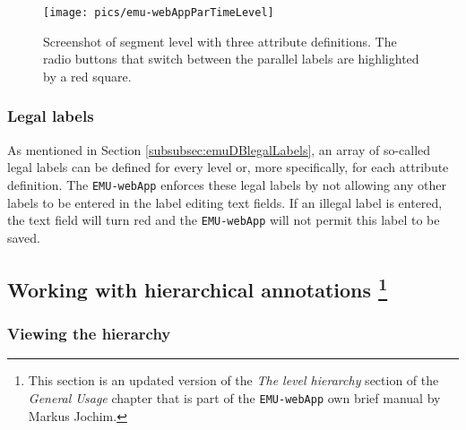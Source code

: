 \documentclass[
]{book}
\begin{document}
\begin{figure}

{\centering \texttt{[image: pics/emu-webAppParTimeLevel]} 

}

\caption{Screenshot of segment level with three attribute definitions. The radio buttons that switch between the parallel labels are highlighted by a red square.}\label{fig:webApp-parTimeLevel}
\end{figure}

\hypertarget{legal-labels}{%
\subsubsection*{Legal labels}\label{legal-labels}}

As mentioned in Section \ref{subsubsec:emuDBlegalLabels}, an array of so-called legal labels can be defined for every level or, more specifically, for each attribute definition. The \texttt{EMU-webApp} enforces these legal labels by not allowing any other labels to be entered in the label editing text fields. If an illegal label is entered, the text field will turn red and the \texttt{EMU-webApp} will not permit this label to be saved.

\hypertarget{working-with-hierarchical-annotations-2-chapemu-webapp}{%
\subsection[Working with hierarchical annotations ]{\texorpdfstring{Working with hierarchical annotations \footnote{This section is an updated version of the \emph{The level hierarchy} section of the \emph{General Usage} chapter that is part of the \texttt{EMU-webApp} own brief manual by Markus Jochim.}}{Working with hierarchical annotations }}\label{working-with-hierarchical-annotations-2-chapemu-webapp}}

\hypertarget{viewing-the-hierarchy}{%
\subsubsection*{Viewing the hierarchy}\label{viewing-the-hierarchy}}
\end{document}
